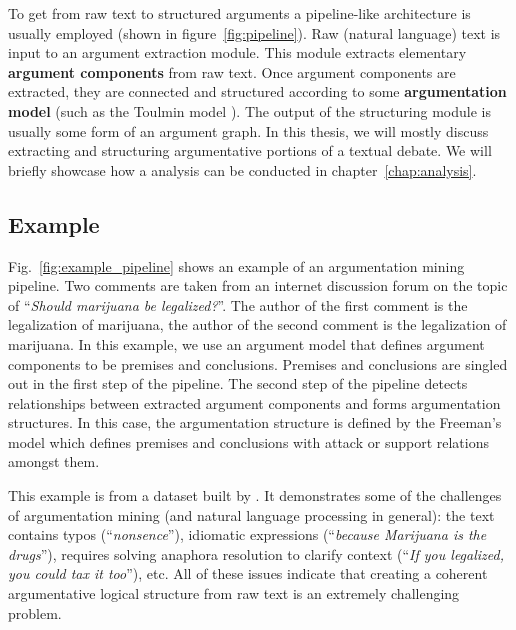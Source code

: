 To get from raw text to structured arguments a pipeline-like architecture
is usually employed (shown in figure~\ref{fig:pipeline}). 
Raw (natural language) text is input to an argument extraction module. This module
extracts elementary \textbf{argument components} from raw text. 
Once argument components are extracted, they are connected and structured 
according to some \textbf{argumentation model} (such as the Toulmin model \citep{toulmin2003uses}).
The output of the structuring module is usually some form of an argument graph. 
In this thesis, we will mostly discuss extracting and structuring argumentative
portions of a textual debate. We will briefly showcase how a analysis can be
conducted in chapter~\ref{chap:analysis}. 

\subsection{Example}


Fig.~\ref{fig:example_pipeline} shows an example of an argumentation mining
pipeline. Two comments are taken from an internet discussion forum on the topic
of ``\emph{Should marijuana be legalized?}''. The author of the first comment
is  the legalization of marijuana, the author of the second
comment is  the legalization of marijuana.  In this example, we use an
argument model that defines argument components to be premises and conclusions.
Premises and conclusions are singled out in the first step of the pipeline.
The second step of the pipeline detects relationships between extracted
argument components and forms argumentation structures. In this case, the
argumentation structure is defined by the Freeman's model
\citep{freeman2011argument} which defines premises and conclusions with attack
or support relations amongst them. 

This example is from a dataset built by \citet{hasan2014you}. It demonstrates
some of the challenges of argumentation mining (and natural language processing
in general): the text contains typos (``\emph{nonsence}''), idiomatic
expressions (``\emph{because Marijuana is the drugs}''), requires solving
anaphora resolution to clarify context (``\emph{If you legalized, you could tax
it too}''), etc. All of these issues indicate that creating a coherent
argumentative logical structure from raw text is an extremely challenging
problem.


